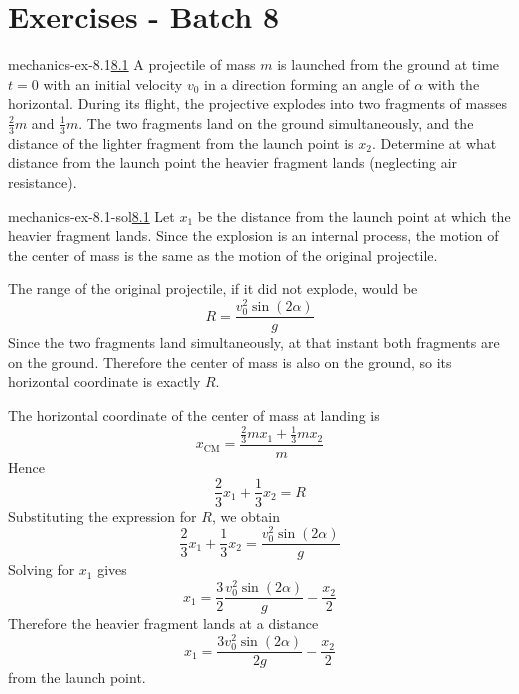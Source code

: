 \documentclass[preview]{standalone}
\begin{document}
\genpage

\section{Exercises - Batch 8}

\begin{snippetexercise}{mechanics-ex-8.1}{\underline{8.1}}
    A projectile of mass \(m\) is launched from the ground at time \(t=0\)
    with an initial velocity \(v_0\) in a direction forming an angle of \(\alpha\)
    with the horizontal.
    During its flight, the projective explodes into two fragments of masses
    \(\frac{2}{3}m\) and \(\frac{1}{3}m\). The two fragments
    land on the ground simultaneously, and the distance of the lighter fragment from the launch point is
    \(x_2\). Determine at what distance from the launch point the heavier fragment lands (neglecting air resistance).
\end{snippetexercise}

\begin{snippetsolution}{mechanics-ex-8.1-sol}{\underline{8.1}}
    Let \(x_1\) be the distance from the launch point at which the heavier fragment
    lands. Since the explosion is an internal process, the motion of the center of
    mass is the same as the motion of the original projectile.

    The range of the original projectile, if it did not explode, would be
    \[
        R = \frac{v_0^2\sin(2\alpha)}{g}
    \]
    Since the two fragments land simultaneously, at that instant both fragments are
    on the ground. Therefore the center of mass is also on the ground, so its
    horizontal coordinate is exactly \(R\).

    The horizontal coordinate of the center of mass at landing is
    \[
        x_{\mathrm{CM}}
        =
        \frac{
            \frac{2}{3}m x_1 + \frac{1}{3}m x_2
        }{m}
    \]
    Hence
    \[
        \frac{2}{3}x_1 + \frac{1}{3}x_2 = R
    \]
    Substituting the expression for \(R\), we obtain
    \[
        \frac{2}{3}x_1 + \frac{1}{3}x_2
        =
        \frac{v_0^2\sin(2\alpha)}{g}
    \]
    Solving for \(x_1\) gives
    \[
        x_1
        =
        \frac{3}{2}\frac{v_0^2\sin(2\alpha)}{g}
        -
        \frac{x_2}{2}
    \]
    Therefore the heavier fragment lands at a distance
    \[
        x_1
        =
        \frac{3v_0^2\sin(2\alpha)}{2g}
        -
        \frac{x_2}{2}
    \]
    from the launch point.
\end{snippetsolution}
\end{document}
